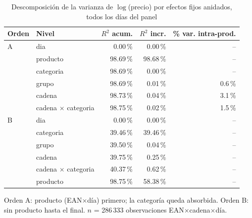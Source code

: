 \begin{table}[htbp]
\caption{Descomposici\'on de la varianza de $\log$(precio) por efectos fijos anidados, todos los d\'ias del panel}
\label{tab:varianza}
\centering\scriptsize\setlength{\tabcolsep}{3pt}
\begin{tabular}{@{}llrrr@{}}
\toprule
Orden & Nivel & $R^2$ acum. & $R^2$ incr. & \% var. intra-prod. \\
\midrule
A & dia & 0.00\,\% & 0.00\,\% & -- \\
 & producto & 98.69\,\% & 98.68\,\% & -- \\
 & categoria & 98.69\,\% & 0.00\,\% & -- \\
 & grupo & 98.69\,\% & 0.01\,\% & 0.6\,\% \\
 & cadena & 98.73\,\% & 0.04\,\% & 3.1\,\% \\
 & cadena $\times$ categoria & 98.75\,\% & 0.02\,\% & 1.5\,\% \\
\midrule
B & dia & 0.00\,\% & 0.00\,\% & -- \\
 & categoria & 39.46\,\% & 39.46\,\% & -- \\
 & grupo & 39.50\,\% & 0.04\,\% & -- \\
 & cadena & 39.75\,\% & 0.25\,\% & -- \\
 & cadena $\times$ categoria & 40.37\,\% & 0.62\,\% & -- \\
 & producto & 98.75\,\% & 58.38\,\% & -- \\
\bottomrule\end{tabular}
\par\smallskip\raggedright\scriptsize Orden A: producto (EAN$\times$d\'ia) primero; la categor\'ia queda absorbida. Orden B: sin producto hasta el final. $n$ = 286\,333 observaciones EAN$\times$cadena$\times$d\'ia.
\end{table}

